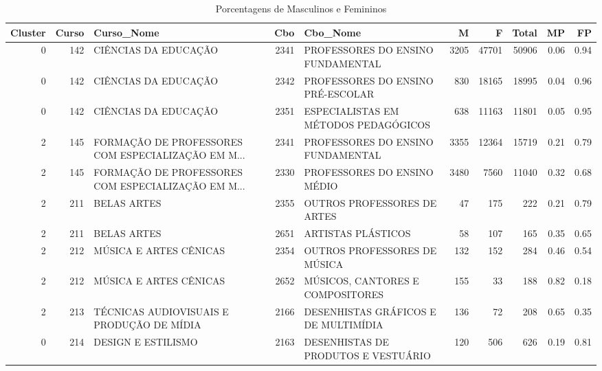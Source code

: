 \begin{table}
\centering
\caption{Porcentagens de Masculinos e Femininos}
\label{tab:Fem_Masc}
\begin{tabular}{rrlrlrrrrr}
\toprule
 Cluster &  Curso &                                         Curso\_Nome &  Cbo &                                           Cbo\_Nome &     M &     F &  Total &   MP &   FP \\
\midrule
       0 &    142 &                               CIÊNCIAS DA EDUCAÇÃO & 2341 &                  PROFESSORES DO ENSINO FUNDAMENTAL &  3205 & 47701 &  50906 & 0.06 & 0.94 \\
       0 &    142 &                               CIÊNCIAS DA EDUCAÇÃO & 2342 &                  PROFESSORES DO ENSINO PRÉ-ESCOLAR &   830 & 18165 &  18995 & 0.04 & 0.96 \\
       0 &    142 &                               CIÊNCIAS DA EDUCAÇÃO & 2351 &               ESPECIALISTAS EM MÉTODOS PEDAGÓGICOS &   638 & 11163 &  11801 & 0.05 & 0.95 \\
       2 &    145 & FORMAÇÃO DE PROFESSORES COM ESPECIALIZAÇÃO EM M... & 2341 &                  PROFESSORES DO ENSINO FUNDAMENTAL &  3355 & 12364 &  15719 & 0.21 & 0.79 \\
       2 &    145 & FORMAÇÃO DE PROFESSORES COM ESPECIALIZAÇÃO EM M... & 2330 &                        PROFESSORES DO ENSINO MÉDIO &  3480 &  7560 &  11040 & 0.32 & 0.68 \\
       2 &    211 &                                        BELAS ARTES & 2355 &                        OUTROS PROFESSORES DE ARTES &    47 &   175 &    222 & 0.21 & 0.79 \\
       2 &    211 &                                        BELAS ARTES & 2651 &                                 ARTISTAS PLÁSTICOS &    58 &   107 &    165 & 0.35 & 0.65 \\
       2 &    212 &                             MÚSICA E ARTES CÊNICAS & 2354 &                       OUTROS PROFESSORES DE MÚSICA &   132 &   152 &    284 & 0.46 & 0.54 \\
       2 &    212 &                             MÚSICA E ARTES CÊNICAS & 2652 &                   MÚSICOS, CANTORES E COMPOSITORES &   155 &    33 &    188 & 0.82 & 0.18 \\
       2 &    213 &          TÉCNICAS AUDIOVISUAIS E PRODUÇÃO DE MÍDIA & 2166 &               DESENHISTAS GRÁFICOS E DE MULTIMÍDIA &   136 &    72 &    208 & 0.65 & 0.35 \\
       0 &    214 &                                 DESIGN E ESTILISMO & 2163 &               DESENHISTAS DE PRODUTOS E  VESTUÁRIO &   120 &   506 &    626 & 0.19 & 0.81 \\

\end{tabular}
\end{table}
